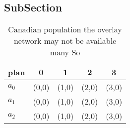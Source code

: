 \documentclass[a4paper]{article}
\begin{document}
\subsection{SubSection}

\begin{table}
\begin{adjustbox}{width=0.5\columnwidth}
\begin{tabular}{|l|l|l|l|l|}
\hline
\textbf{plan} & \multicolumn{1}{c|}{\textbf{0}} & \multicolumn{1}{c|}{\textbf{1}} & \multicolumn{1}{c|}{\textbf{2}} & \multicolumn{1}{c|}{\textbf{3}} \\ \hline
\textbf{$a_0$}  & (0,0) & (1,0) & (2,0) & (3,0) \\ \hline
\textbf{$a_1$}  & (0,0) & (1,0) & (2,0) & (3,0) \\ \hline
\textbf{$a_2$}  & (0,0) & (1,0) & (2,0) & (3,0) \\ \hline
\end{tabular}
\end{adjustbox}
\caption{Canadian population the overlay network may not be available many So 
}
\end{table}
\end{document}
